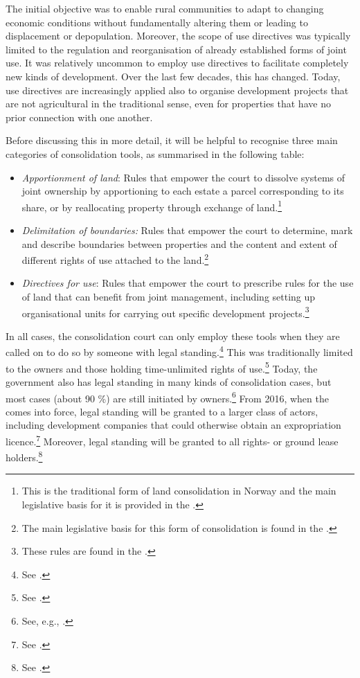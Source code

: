 The initial objective was to enable rural communities to adapt to changing economic conditions without fundamentally altering them or leading to displacement or depopulation. Moreover, the scope of use directives was typically limited to the regulation and reorganisation of already established forms of joint use. It was relatively uncommon to employ use directives to facilitate completely new kinds of development. Over the last few decades, this has changed. Today, use directives are increasingly applied also to organise development projects that are not agricultural in the traditional sense, even for properties that have no prior connection with one another. 

Before discussing this in more detail, it will be helpful to recognise three main categories of consolidation tools, as summarised in the following table:

\begin{itemize}
\item \emph{Apportionment of land}: Rules that empower the court to dissolve systems of joint ownership by apportioning to each estate a parcel corresponding to its share, or by reallocating property through exchange of land.\footnote{This is the traditional form of land consolidation in Norway and the main legislative basis for it is provided in the \cite[2 a)-b)]{lca79}.}
\item \emph{Delimitation of boundaries:} Rules that empower the court to determine, mark and describe boundaries between properties and the content and extent of different rights of use attached to the land.\footnote{The main legislative basis for this form of consolidation is found in the \cite[88]{lca79}.}
\item \emph{Directives for use}: Rules that empower the court to prescribe rules for the use of land that can benefit from joint management, including setting up organisational units for carrying out specific development projects.\footnote{These rules are found in the \cite[2 c)|34-35]{lca79}.}
\end{itemize}

In all cases, the consolidation court can only employ these tools when they are called on to do so by someone with legal standing.\footnote{See \cite[5]{lca79}.} This was traditionally limited to the owners and those holding time-unlimited rights of use.\footnote{See \cite[5]{lca79}.} Today, the government also has legal standing in many kinds of consolidation cases, but most cases (about 90 \%) are still initiated by owners.\footnote{See, e.g., \cite[135]{bjerva12}.} From 2016, when the \cite{lca13} comes into force, legal standing will be granted to a larger class of actors, including development companies that could otherwise obtain an expropriation licence.\footnote{See \cite[1-5(3)]{lca13}.} Moreover, legal standing will be granted to all rights- or ground lease holders.\footnote{See \cite[1-5(1)]{lca13}.}

